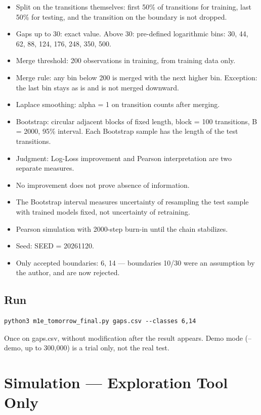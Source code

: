 \documentclass[12pt,a4paper]{article}
\begin{document}
\begin{itemize}
\item Split on the transitions themselves: first 50\% of transitions for training, last 50\% for testing, and the transition on the boundary is not dropped.
\item Gaps up to 30: exact value. Above 30: pre-defined logarithmic bins: 30, 44, 62, 88, 124, 176, 248, 350, 500.
\item Merge threshold: 200 observations in training, from training data only.
\item Merge rule: any bin below 200 is merged with the next higher bin. Exception: the last bin stays as is and is not merged downward.
\item Laplace smoothing: alpha = 1 on transition counts after merging.
\item Bootstrap: circular adjacent blocks of fixed length, block = 100 transitions, B = 2000, 95\% interval. Each Bootstrap sample has the length of the test transitions.
\item Judgment: Log-Loss improvement and Pearson interpretation are two separate measures.
\item No improvement does not prove absence of information.
\item The Bootstrap interval measures uncertainty of resampling the test sample with trained models fixed, not uncertainty of retraining.
\item Pearson simulation with 2000-step burn-in until the chain stabilizes.
\item Seed: SEED = 20261120.
\item Only accepted boundaries: 6, 14 — boundaries 10/30 were an assumption by the author, and are now rejected.
\end{itemize}

\subsection{Run}

\begin{verbatim}
python3 m1e_tomorrow_final.py gaps.csv --classes 6,14
\end{verbatim}

Once on gaps.csv, without modification after the result appears. Demo mode (--demo, up to 300,000) is a trial only, not the real test.

\section{Simulation — Exploration Tool Only}
\end{document}
